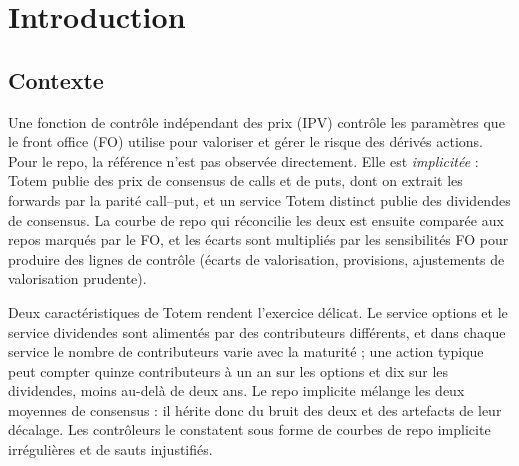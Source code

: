 \section{Introduction}\label{sec-intro}

\subsection{Contexte}
Une fonction de contrôle indépendant des prix (IPV) contrôle les paramètres que le front office (FO) utilise pour
valoriser et gérer le risque des dérivés actions. Pour le repo, la référence n'est pas observée directement. Elle est
\emph{implicitée} : Totem publie des prix de consensus de calls et de puts, dont on extrait les forwards par la
parité call--put, et un service Totem distinct publie des dividendes de consensus. La courbe de repo qui réconcilie
les deux est ensuite comparée aux repos marqués par le FO, et les écarts sont multipliés par les sensibilités FO pour
produire des lignes de contrôle (écarts de valorisation, provisions, ajustements de valorisation prudente).

Deux caractéristiques de Totem rendent l'exercice délicat. Le service options et le service dividendes sont alimentés
par des contributeurs différents, et dans chaque service le nombre de contributeurs varie avec la maturité ; une action
typique peut compter quinze contributeurs à un an sur les options et dix sur les dividendes, moins au-delà de deux ans.
Le repo implicite mélange les deux moyennes de consensus : il hérite donc du bruit des deux et des artefacts de leur
décalage. Les contrôleurs le constatent sous forme de courbes de repo implicite irrégulières et de sauts injustifiés.

